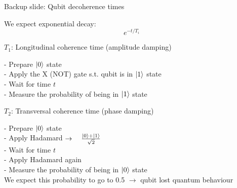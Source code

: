 \documentclass[10pt]{beamer}
\begin{document}
\appendix
{
\begin{frame}[fragile]{Backup slide: Qubit decoherence times}

We expect exponential decay:
\begin{equation}
e^{−t/T_i}
\end{equation}

\begin{block}{$T_1$: Longitudinal coherence time (amplitude damping)}

- Prepare $\ket{0}$ state\\
- Apply the X (NOT) gate s.t. qubit is in $\ket{1}$ state\\
- Wait for time $t$\\
- Measure the probability of being in $\ket{1}$ state

\end{block}
\begin{block}{$T_2$: Transversal coherence time (phase damping)}

- Prepare $\ket{0}$ state\\
- Apply Hadamard $\rightarrow \quad \frac{\ket{0}+\ket{1}}{\sqrt{2}}$\\
- Wait for time $t$\\
- Apply Hadamard again\\
- Measure the probability of being in $\ket{0}$ state\\

We expect this probability to go to 0.5 $\rightarrow$ qubit lost quantum behaviour
\end{block}

\end{frame}
}
\end{document}
